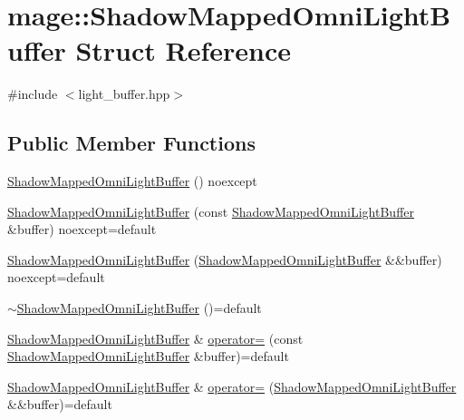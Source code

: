 \hypertarget{structmage_1_1_shadow_mapped_omni_light_buffer}{}\section{mage\+:\+:Shadow\+Mapped\+Omni\+Light\+Buffer Struct Reference}
\label{structmage_1_1_shadow_mapped_omni_light_buffer}


{\ttfamily \#include $<$light\+\_\+buffer.\+hpp$>$}

\subsection*{Public Member Functions}
\begin{DoxyCompactItemize}
\item 
\hyperlink{structmage_1_1_shadow_mapped_omni_light_buffer_af1283b0d5d9aab08b221d2053a3ab023}{Shadow\+Mapped\+Omni\+Light\+Buffer} () noexcept
\item 
\hyperlink{structmage_1_1_shadow_mapped_omni_light_buffer_a179cdb73fe29141d129da3e7f26ddd4e}{Shadow\+Mapped\+Omni\+Light\+Buffer} (const \hyperlink{structmage_1_1_shadow_mapped_omni_light_buffer}{Shadow\+Mapped\+Omni\+Light\+Buffer} \&buffer) noexcept=default
\item 
\hyperlink{structmage_1_1_shadow_mapped_omni_light_buffer_abf606d09675b88abe17a61d83c70b04b}{Shadow\+Mapped\+Omni\+Light\+Buffer} (\hyperlink{structmage_1_1_shadow_mapped_omni_light_buffer}{Shadow\+Mapped\+Omni\+Light\+Buffer} \&\&buffer) noexcept=default
\item 
\hyperlink{structmage_1_1_shadow_mapped_omni_light_buffer_a1a56dcb8621d38894f939b704e0bdd1a}{$\sim$\+Shadow\+Mapped\+Omni\+Light\+Buffer} ()=default
\item 
\hyperlink{structmage_1_1_shadow_mapped_omni_light_buffer}{Shadow\+Mapped\+Omni\+Light\+Buffer} \& \hyperlink{structmage_1_1_shadow_mapped_omni_light_buffer_a575b96d6ebeee24e639048b0d257a462}{operator=} (const \hyperlink{structmage_1_1_shadow_mapped_omni_light_buffer}{Shadow\+Mapped\+Omni\+Light\+Buffer} \&buffer)=default
\item 
\hyperlink{structmage_1_1_shadow_mapped_omni_light_buffer}{Shadow\+Mapped\+Omni\+Light\+Buffer} \& \hyperlink{structmage_1_1_shadow_mapped_omni_light_buffer_a35a4b85d3f556437a10d330ef32abc0d}{operator=} (\hyperlink{structmage_1_1_shadow_mapped_omni_light_buffer}{Shadow\+Mapped\+Omni\+Light\+Buffer} \&\&buffer)=default
\end{DoxyCompactItemize}
